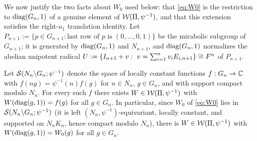 \medskip
We now justify the two facts about $W_0$ used below: that \eqref{eq:W0} is the
restriction to $\operatorname{diag}(G_n,1)$ of a genuine element of $\mathcal{W}(\Pi,\psi^{-1})$, and that
this extension satisfies the right-$u_1$ translation identity. Let
$P_{n+1}:=\{p\in G_{n+1}:\text{last row of }p\text{ is }(0,\dots,0,1)\}$ be the
mirabolic subgroup of $G_{n+1}$; it is generated by $\operatorname{diag}(G_n,1)$ and $N_{n+1}$, and
$\operatorname{diag}(G_n,1)$ normalizes the abelian unipotent radical
$U:=\{I_{n+1}+v:\ v=\sum_{i=1}^{n}v_iE_{i,n+1}\}\cong\qtwoF^n$ of $P_{n+1}$.

\begin{qtwolemma}\label{lem:extend}
Let $\mathcal{S}(N_n\backslash G_n;\psi^{-1})$ denote the space of locally constant functions
$f:G_n\to\mathbb{C}$ with $f(ng)=\psi^{-1}(n)f(g)$ for $n\in N_n$, $g\in G_n$, and with support
compact modulo $N_n$. For every such $f$ there exists $W\in\mathcal{W}(\Pi,\psi^{-1})$ with
$W(\operatorname{diag}(g,1))=f(g)$ for all $g\in G_n$. In particular, since $W_0$ of \eqref{eq:W0}
lies in $\mathcal{S}(N_n\backslash G_n;\psi^{-1})$ \textup{(}it is left $(N_n,\psi^{-1})$-equivariant,
locally constant, and supported on $N_nK_n$, hence compact modulo $N_n$\textup{)}, there is
$W\in\mathcal{W}(\Pi,\psi^{-1})$ with $W(\operatorname{diag}(g,1))=W_0(g)$ for all $g\in G_n$.
\end{qtwolemma}

